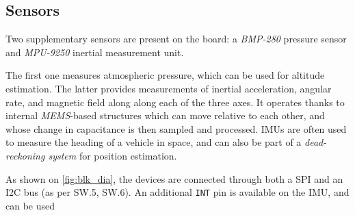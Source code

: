 \subsection{Sensors}

Two supplementary sensors are present on the board: a \emph{BMP-280} pressure sensor and \emph{MPU-9250} inertial measurement unit.

The first one measures atmospheric pressure, which can be used for altitude estimation.
The latter provides measurements of inertial acceleration, angular rate, and magnetic field along along each of the three axes.
It operates thanks to internal \emph{MEMS}-based structures which can move relative to each other, and whose change in capacitance is then sampled and processed.
IMUs are often used to measure the heading of a vehicle in space, and can also be part of a \emph{dead-reckoning system} for position estimation.

As shown on \autoref{fig:blk_dia}, the devices are connected through both a SPI and an I2C bus (as per SW.5, SW.6).
An additional \texttt{INT} pin is available on the IMU, and can be used
